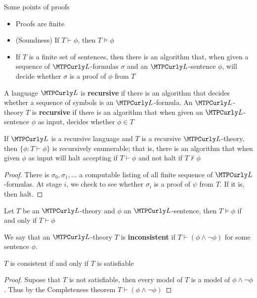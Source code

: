 \documentclass[11pt]{article}
\begin{document}
Some points of proofs
\begin{itemize}
\item Proofs are finite
\item (Soundness) If \(T\vdash\phi\), then \(T\models\phi\)
\item If \(T\) is a finite set of sentences, then there is an algorithm that,
when given a sequence of \(\call\)-formulas \(\sigma\) and an \(\call\)-sentence \(\phi\),
will decide whether \(\sigma\) is a proof of \(\phi\) from \(T\)
\end{itemize}

A language \(\call\) is \textbf{recursive} if there is an algorithm that decides
whether a sequence of symbols is an \(\call\)-formula. An \(\call\)-theory
\(T\) is \textbf{recursive} if there is an algorithm that when given an
\(\call\)-sentence \(\phi\) as input, decides whether \(\phi\in T\)

\begin{proposition}[]
\label{prop2.1.1}
If \(\call\) is a recursive language and \(T\) is a recursive \(\call\)-theory,
then \(\{\phi:T\vdash\phi\}\) is recursively enumerable; that is, there is an
algorithm that when given \(\phi\) as input will halt accepting if \(T\vdash\phi\)
and not halt if \(T\not\vdash\phi\)
\end{proposition}
\begin{proof}
There is \(\sigma_0,\sigma_1,\dots\) a computable listing of all finite
sequence of \(\call\)-formulas. At stage \(i\), we check to see whether
\(\sigma_i\) is a proof of \(\psi\) from \(T\). If it is, then halt.
\end{proof}

\begin{theorem}
Let \(T\) be an \(\call\)-theory and \(\phi\) an \(\call\)-sentence, then
\(T\models\phi\) if and only if \(T\vdash \phi\)
\end{theorem}

We say that an \(\call\)-theory \(T\) is \textbf{inconsistent} if
\(T\vdash(\phi\wedge\neg\phi)\) for some sentence \(\phi\).

\begin{corollary}[]
\(T\) is consistent if and only if \(T\) is satisfiable
\end{corollary}

\begin{proof}
Supose that \(T\) is not satisfiable, then every model of \(T\) is a model of
\(\phi\wedge\neg\phi\). Thus by the Completeness theorem
\(T\vdash(\phi\wedge\neg\phi)\) 
\end{proof}
\end{document}
